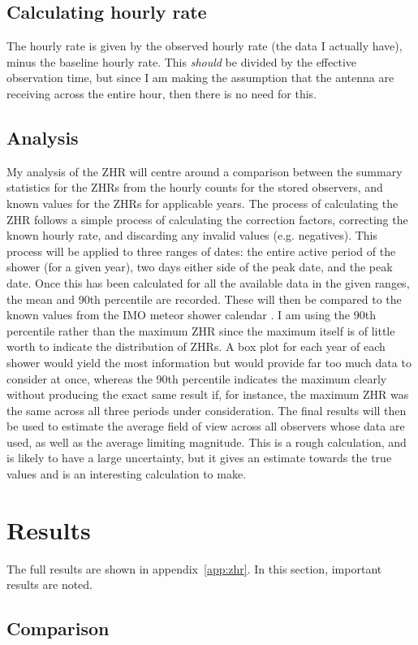 \subsection{Calculating hourly rate}
The hourly rate is given by the observed hourly rate (the data I actually have), minus the baseline hourly rate. This \textit{should} be divided by the effective observation time, but since I am making the assumption that the antenna are receiving across the entire hour, then there is no need for this.
\subsection{Analysis}
My analysis of the ZHR will centre around a comparison between the summary statistics for the ZHRs from the hourly counts for the stored observers, and known values for the ZHRs for applicable years. The process of calculating the ZHR follows a simple process of calculating the correction factors, correcting the known hourly rate, and discarding any invalid values (e.g. negatives). 
This process will be applied to three ranges of dates: the entire active period of the shower (for a given year), two days either side of the peak date, and the peak date. Once this has been calculated for all the available data in the given ranges, the mean and 90th percentile are recorded. These will then be compared to the known values from the IMO meteor shower calendar \cite{imo_meteor_calendar}. I am using the 90th percentile rather than the maximum ZHR since the maximum itself is of little worth to indicate the distribution of ZHRs. A box plot for each year of each shower would yield the most information but would provide far too much data to consider at once, whereas the 90th percentile indicates the maximum clearly without producing the exact same result if, for instance, the maximum ZHR was the same across all three periods under consideration. 
The final results will then be used to estimate the average field of view across all observers whose data are used, as well as the average limiting magnitude. This is a rough calculation, and is likely to have a large uncertainty, but it gives an estimate towards the true values and is an interesting calculation to make.
\section{Results}
The full results are shown in appendix~\ref{app:zhr}. In this section, important results are noted.
\subsection{Comparison}

